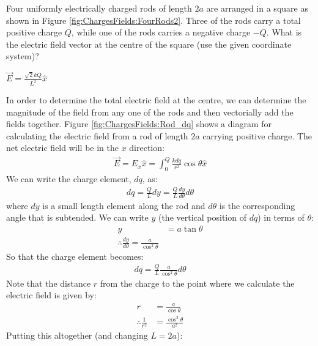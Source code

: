 \question Four uniformly electrically charged rods of length $2a$ are arranged in a square as shown in Figure \ref{fig:ChargesFields:FourRods2}. Three of the rods carry a total positive charge $Q$, while one of the rods carries a negative charge $-Q$. What is the electric field vector at the centre of the square (use the given coordinate system)?
\begin{finalanswer}
	$\vec E = \frac{\sqrt{2}kQ}{L^2}\hat x $
\end{finalanswer}
\begin{solution}
	In order to determine the total electric field at the centre, we can determine the magnitude of the field from any one of the rods and then vectorially add the fields together. Figure \ref{fig:ChargesFields:Rod_dq} shows a diagram for calculating the electric field from a rod of length $2a$ carrying positive charge.
	The net electric field will be in the $x$ direction:
	\begin{align*}
	\vec E=E_x\hat x=\int_0^Q\frac{kdq}{r^2}\cos\theta \hat x
	\end{align*}
	We can write the charge element, $dq$, as:
	\begin{align*}
	dq=\frac{Q}{L}dy=\frac{Q}{L}\frac{dy}{d\theta}{d\theta}
	\end{align*}
	where $dy$ is a small length element along the rod and $d\theta$ is the corresponding angle that is subtended. We can write $y$ (the vertical position of $dq$) in terms of $\theta$:
	\begin{align*}
	y&=a\tan\theta\\
	\therefore\frac{dy}{d\theta}=\frac{a}{\cos^2\theta}
	\end{align*}
	So that the charge element becomes:
	\begin{align*}
	dq=\frac{Q}{L}\frac{a}{\cos^2\theta}d\theta
	\end{align*}
	Note that the distance $r$ from the charge to the point where we calculate the electric field is given by:
	\begin{align*}
	r&=\frac{a}{\cos\theta}\\
	\therefore\frac{1}{r^2}&=\frac{\cos^2\theta}{a^2}
	\end{align*}
	Putting this altogether (and changing $L=2a$):

\end{solution}
